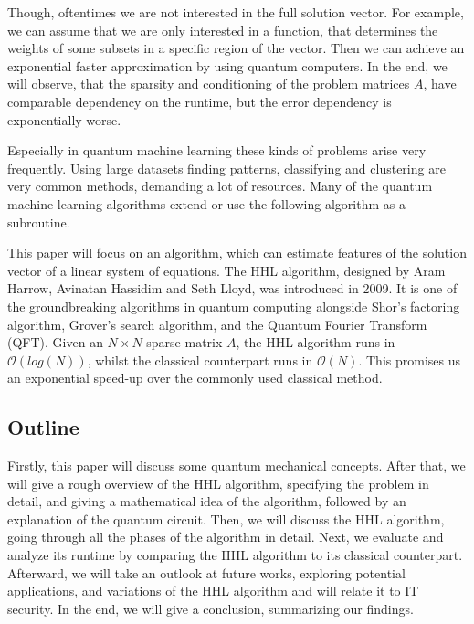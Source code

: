Though, oftentimes we are not interested in the full solution vector. 
For example, we can assume that we are only interested in a function, that determines the weights of some subsets in a specific region of the vector.
Then we can achieve an exponential faster approximation by using quantum computers. 
In the end, we will observe, that the sparsity and conditioning of the problem matrices $A$, have comparable dependency on the runtime, but the error dependency is exponentially worse. 

Especially in quantum machine learning these kinds of problems arise very frequently. 
Using large datasets finding patterns, classifying and clustering are very common methods, demanding a lot of resources. 
Many of the quantum machine learning algorithms extend or use the following algorithm as a subroutine. 

This paper will focus on an algorithm, which can estimate features of the solution vector of a linear system of equations.
The HHL algorithm, designed by Aram Harrow, Avinatan Hassidim and Seth Lloyd, was introduced in 2009. 
It is one of the groundbreaking algorithms in quantum computing alongside Shor's factoring algorithm, Grover's search algorithm, and the Quantum Fourier Transform (QFT).
Given an $N \times N$ sparse matrix $A$, the HHL algorithm runs in $\mathcal{O} (log (N))$, whilst the classical counterpart runs in $\mathcal{O} (N)$.
This promises us an exponential speed-up over the commonly used classical method.

\subsection{Outline}
Firstly, this paper will discuss some quantum mechanical concepts.
After that, we will give a rough overview of the HHL algorithm, specifying the problem in detail, and giving a mathematical idea of the algorithm, followed by an explanation of the quantum circuit.
Then, we will discuss the HHL algorithm, going through all the phases of the algorithm in detail. 
Next, we evaluate and analyze its runtime by comparing the HHL algorithm to its classical counterpart. 
Afterward, we will take an outlook at future works, exploring potential applications, and variations of the HHL algorithm and will relate it to IT security. 
In the end, we will give a conclusion, summarizing our findings. 


